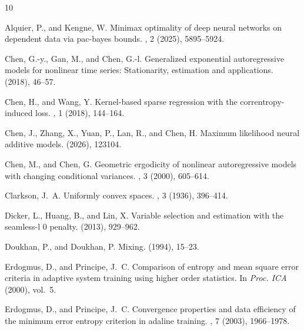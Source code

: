 \documentclass[10pt,twoside]{article}
\numberwithin{equation}{section}
\begin{document}
\begin{thebibliography}{10}

{\sc Alquier, P., and Kengne, W.}
\newblock Minimax optimality of deep neural networks on dependent data via
  pac-bayes bounds.
, 2 (2025), 5895--5924.

{\sc Chen, G.-y., Gan, M., and Chen, G.-l.}
\newblock Generalized exponential autoregressive models for nonlinear time
  series: Stationarity, estimation and applications.
 (2018), 46--57.

{\sc Chen, H., and Wang, Y.}
\newblock Kernel-based sparse regression with the correntropy-induced loss.
, 1 (2018),
  144--164.

{\sc Chen, J., Zhang, X., Yuan, P., Lan, R., and Chen, H.}
\newblock Maximum likelihood neural additive models.
 (2026), 123104.

{\sc Chen, M., and Chen, G.}
\newblock Geometric ergodicity of nonlinear autoregressive models with changing
  conditional variances.
, 3 (2000), 605--614.

{\sc Clarkson, J.~A.}
\newblock Uniformly convex spaces.
, 3 (1936),
  396--414.

{\sc Dicker, L., Huang, B., and Lin, X.}
\newblock Variable selection and estimation with the seamless-l 0 penalty.
 (2013), 929--962.

{\sc Doukhan, P., and Doukhan, P.}
\newblock Mixing.
 (1994), 15--23.

{\sc Erdogmus, D., and Principe, J.~C.}
\newblock Comparison of entropy and mean square error criteria in adaptive
  system training using higher order statistics.
\newblock In {\em Proc. ICA\/} (2000), vol.~5.

{\sc Erdogmus, D., and Principe, J.~C.}
\newblock Convergence properties and data efficiency of the minimum error
  entropy criterion in adaline training.
, 7 (2003),
  1966--1978.


\end{thebibliography}
\end{document}
